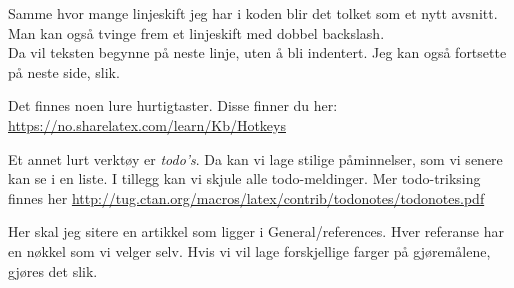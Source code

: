 \documentclass[a4paper]{report}
\begin{document}
    Samme hvor mange linjeskift jeg har i koden blir det tolket som et nytt avsnitt. Man kan også tvinge frem et linjeskift med dobbel backslash.\\
    Da vil teksten begynne på neste linje, uten å bli indentert. Jeg kan også fortsette på neste side, slik. \newpage
    
    Det finnes noen lure hurtigtaster. Disse finner du her: \url{https://no.sharelatex.com/learn/Kb/Hotkeys}
    
    Et annet lurt verktøy er \textit{todo's}. Da kan vi lage stilige påminnelser, som vi senere kan se i en liste. I tillegg kan vi skjule alle todo-meldinger.  Mer todo-triksing finnes her \url{http://tug.ctan.org/macros/latex/contrib/todonotes/todonotes.pdf}
    
    Her skal jeg sitere en artikkel som ligger i General/references.\cite{lenz1990review} Hver referanse har en nøkkel som vi velger selv. 
    Hvis vi vil lage forskjellige farger på gjøremålene, gjøres det slik.
    
\end{document}
